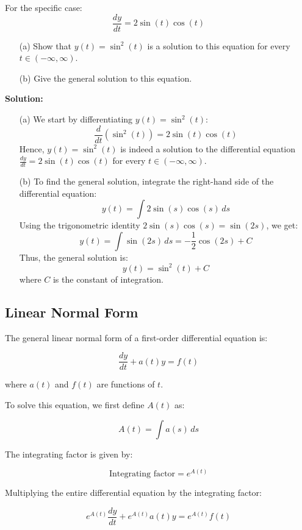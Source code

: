 \documentclass{article}
\begin{document}
For the specific case: 
\[
\frac{dy}{dt} = 2\sin(t)\cos(t)
\]

\begin{enumerate}
    \item[(a)] Show that \(y(t) = \sin^2(t)\) is a solution to this equation for every \(t \in (-\infty, \infty)\).
    
    \item[(b)] Give the general solution to this equation.
\end{enumerate}

\textbf{Solution:}

\begin{enumerate}
    \item[(a)] We start by differentiating \(y(t) = \sin^2(t)\):
    \[
    \frac{d}{dt}\left(\sin^2(t)\right) = 2\sin(t)\cos(t)
    \]
    Hence, \(y(t) = \sin^2(t)\) is indeed a solution to the differential equation \(\frac{dy}{dt} = 2\sin(t)\cos(t)\) for every \(t \in (-\infty, \infty)\).

    \item[(b)] To find the general solution, integrate the right-hand side of the differential equation:
    \[
    y(t) = \int 2\sin(s)\cos(s) \, ds
    \]
    Using the trigonometric identity \(2\sin(s)\cos(s) = \sin(2s)\), we get:
    \[
    y(t) = \int \sin(2s) \, ds = -\frac{1}{2}\cos(2s) + C
    \]
    Thus, the general solution is:
    \[
    y(t) = \sin^2(t) + C
    \]
    where \(C\) is the constant of integration.
\end{enumerate}


\subsection*{Linear Normal Form}

The general linear normal form of a first-order differential equation is:

\[
\frac{dy}{dt} + a(t)y = f(t)
\]

where \(a(t)\) and \(f(t)\) are functions of \(t\).

To solve this equation, we first define \(A(t)\) as:

\[
A(t) = \int a(s) \, ds
\]

The integrating factor is given by:

\[
\text{Integrating factor} = e^{A(t)}
\]

Multiplying the entire differential equation by the integrating factor:

\[
e^{A(t)} \frac{dy}{dt} + e^{A(t)} a(t) y = e^{A(t)} f(t)
\]
\end{document}
